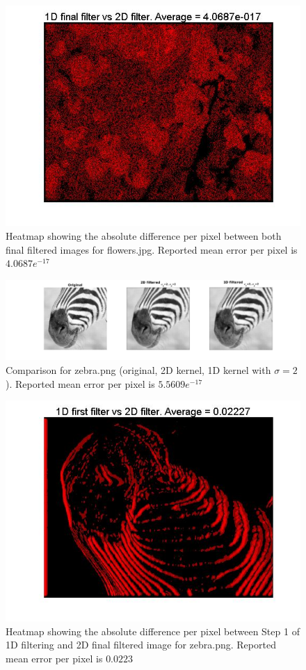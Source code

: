 \documentclass[11pt]{article}
\begin{document}
\begin{figure}[H] \centering
	\includegraphics[width=.9\textwidth]{imgs/flowers_heatmap.jpg}
	\caption{Heatmap showing the absolute difference per pixel between both
		final filtered images for flowers.jpg. Reported mean error per pixel is
		$4.0687 e^{-17}$}
	\label{fig:flowers_heatmap}
\end{figure}

\begin{figure}[H] \centering
	\includegraphics[width=1\textwidth]{imgs/zebra_conv.jpg}
	\caption{Comparison for zebra.png (original, 2D kernel, 1D kernel with
		$\sigma=2$). Reported mean error per pixel is $5.5609 e^{-17}$}
	\label{fig:zebra}
\end{figure}

\begin{figure}[H] \centering
	\includegraphics[width=.9\textwidth]{imgs/zebra_col_heatmap.jpg}
	\caption{Heatmap showing the absolute difference per pixel between Step
		1 of 1D filtering and 2D final filtered image for zebra.png. Reported
		mean error per pixel is $0.0223$}
	\label{fig:zebra_col_heatmap}
\end{figure}
\end{document}
